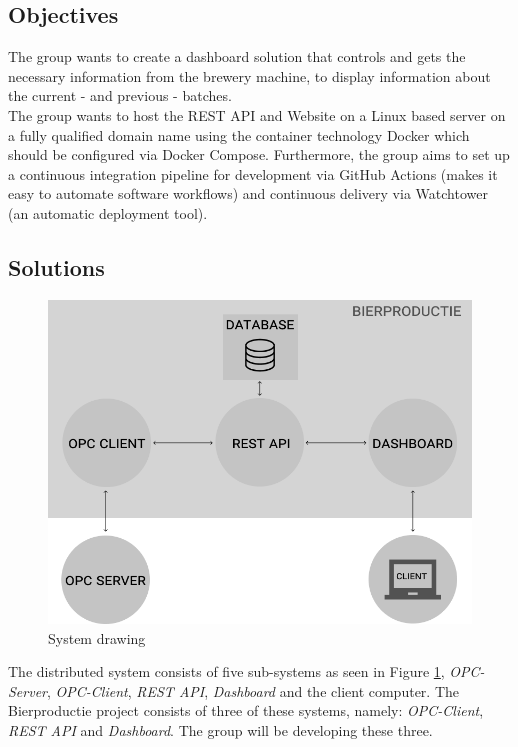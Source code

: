 \subsection{Objectives}
The group wants to create a dashboard solution that controls and gets the
necessary information from the brewery machine, to display information about the
current - and previous - batches.\\

The group wants to host the REST API and Website on a Linux based server on a
fully qualified domain name using the container technology Docker which should
be configured via Docker Compose. Furthermore, the group aims to set up a
continuous integration pipeline for development via GitHub Actions (makes it
easy to automate software workflows) and continuous delivery via Watchtower (an
automatic deployment tool).

\subsection{Solutions}
\begin{figure}[h]
\centering 
\includegraphics[scale=0.3]{images/system_overview.png}
\caption{System drawing} 
\label{figure:system_drawing}
\end{figure}

The distributed system consists of five sub-systems as seen in Figure
\ref{figure:system_drawing}, \textit{OPC-Server}, \textit{OPC-Client},
\textit{REST API}, \textit{Dashboard} and the client computer. The Bierproductie
project consists of three of these systems, namely: \textit{OPC-Client},
\textit{REST API} and \textit{Dashboard}. The group will be developing these
three.

